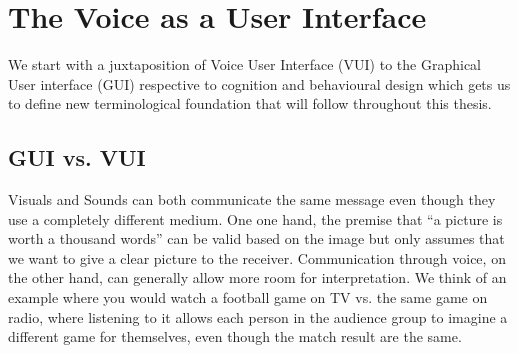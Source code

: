 



































\chapter{The Voice as a User Interface} 
\label{vui}


We start with a juxtaposition of Voice User Interface (VUI) to the Graphical User interface (GUI) respective to cognition and behavioural design which gets us to define new terminological foundation that will follow throughout this thesis.

\section{GUI vs. VUI}
\label{guivsvui}

Visuals and Sounds can both communicate the same message even though they use a  completely different medium. One one hand, the premise that ``a picture is worth a thousand words'' can be valid based on the image but only assumes that we want to give a clear picture to the receiver. Communication through voice, on the other hand, can generally allow more room for interpretation. We think of an example where you would watch a football game on TV vs. the same game on radio, where listening to it allows each person in the audience group to imagine a different game for themselves, even though the match result are the same.


